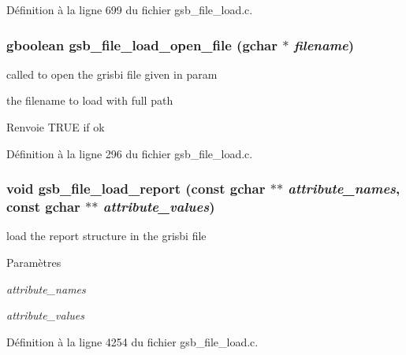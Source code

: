 Définition à la ligne 699 du fichier gsb\_\-file\_\-load.c.

\subsubsection[{gsb\_\-file\_\-load\_\-open\_\-file}]{\setlength{\rightskip}{0pt plus 5cm}gboolean gsb\_\-file\_\-load\_\-open\_\-file (gchar $\ast$ {\em filename})}\label{gsb__file__load_8c_a0e2c06ff7d8e1a4a4e164e21c03049a0}
called to open the grisbi file given in param

the filename to load with full path

\begin{DoxyReturn}{Renvoie}
TRUE if ok 
\end{DoxyReturn}


Définition à la ligne 296 du fichier gsb\_\-file\_\-load.c.

\subsubsection[{gsb\_\-file\_\-load\_\-report}]{\setlength{\rightskip}{0pt plus 5cm}void gsb\_\-file\_\-load\_\-report (const gchar $\ast$$\ast$ {\em attribute\_\-names}, \/  const gchar $\ast$$\ast$ {\em attribute\_\-values})}\label{gsb__file__load_8c_ab1cecde7461c3a46a43f28d70e79db92}
load the report structure in the grisbi file


\begin{DoxyParams}{Paramètres}
\item[{\em attribute\_\-names}]\item[{\em attribute\_\-values}]\end{DoxyParams}


Définition à la ligne 4254 du fichier gsb\_\-file\_\-load.c.

